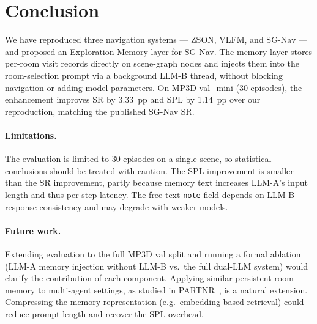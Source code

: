 \documentclass[10pt,twocolumn,letterpaper]{article}
\begin{document}
\section{Conclusion}

We have reproduced three navigation systems --- ZSON, VLFM, and SG-Nav ---
and proposed an Exploration Memory layer for SG-Nav.
The memory layer stores per-room visit records directly on scene-graph nodes
and injects them into the room-selection prompt via a background LLM-B
thread, without blocking navigation or adding model parameters.
On MP3D val\_mini (30 episodes), the enhancement improves SR by 3.33~pp
and SPL by 1.14~pp over our reproduction, matching the published SG-Nav SR.

\paragraph{Limitations.}
The evaluation is limited to 30 episodes on a single scene, so
statistical conclusions should be treated with caution.
The SPL improvement is smaller than the SR improvement, partly because
memory text increases LLM-A's input length and thus per-step latency.
The free-text \texttt{note} field depends on LLM-B response consistency
and may degrade with weaker models.

\paragraph{Future work.}
Extending evaluation to the full MP3D val split and running a formal
ablation (LLM-A memory injection without LLM-B vs.\ the full dual-LLM
system) would clarify the contribution of each component.
Applying similar persistent room memory to multi-agent settings, as
studied in PARTNR~\cite{chang2024partnr}, is a natural extension.
Compressing the memory representation (e.g.\ embedding-based retrieval)
could reduce prompt length and recover the SPL overhead.

{\small


}
\end{document}
